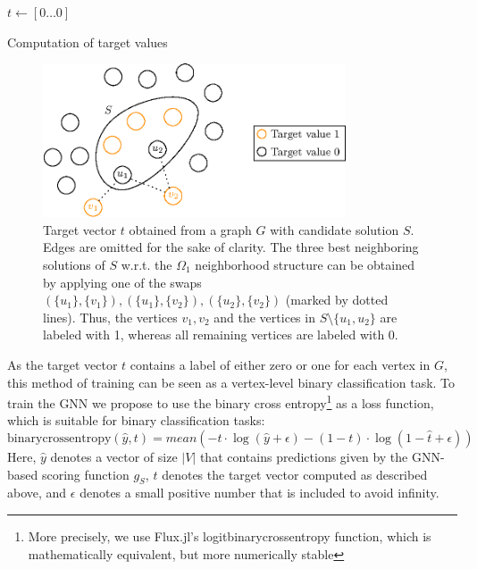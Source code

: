 \documentclass[draft,final]{vutinfth} %
\begin{document}

\begin{algorithm}
    \DontPrintSemicolon
    $t \gets [0 \dots 0]$ 
    \caption{Computation of target values}
    \label{alg:target-values}
\end{algorithm}

\begin{figure}
    \centering
    \includegraphics[width=0.8\textwidth]{graphics/target_values.eps}
    \caption[]{Target vector $t$ obtained from a graph $G$ with candidate solution $S$. Edges are omitted for the sake of clarity. The three best neighboring solutions of $S$ w.r.t. the $\Omega_1$ neighborhood structure can be obtained by applying one of the swaps $(\{u_1\}, \{v_1\}), (\{u_1\}, \{v_2\}), (\{u_2\}, \{v_2\})$ (marked by dotted lines). Thus, the vertices $v_1, v_2$ and the vertices in $S \setminus \{u_1, u_2\}$ are labeled with 1, whereas all remaining vertices are labeled with 0. }
    \label{fig:target-values}
\end{figure}

As the target vector $t$ contains a label of either zero or one for each vertex in $G$, this method of training can be seen as a vertex-level binary classification task. 
To train the GNN we propose to use the binary cross entropy\footnote{More precisely, we use Flux.jl's logitbinarycrossentropy function, which is mathematically equivalent, but more numerically stable} as a loss function, which is suitable for binary classification tasks:
\[
    \mathrm{binarycrossentropy}(\hat{y}, t) = \mathit{mean}(-t \cdot \log(\hat{y} + \epsilon) - (1 - t) \cdot \log(1 - \hat{t} + \epsilon))    
\]
Here, $\hat{y}$ denotes a vector of size $|V|$ that contains predictions given by the GNN-based scoring function $g_S$, $t$ denotes the target vector computed as described above, and $\epsilon$ denotes a small positive number that is included to avoid infinity. 
\end{document}
